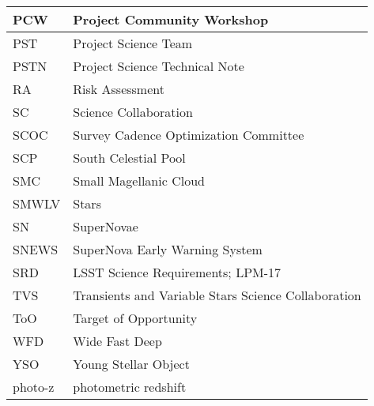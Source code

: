 \begin{longtable}{p{}p{}}
PCW & Project Community Workshop \\\hline
PST & Project Science Team \\\hline
PSTN & Project Science Technical Note \\\hline
RA & Risk Assessment \\\hline
SC & Science Collaboration \\\hline
SCOC & Survey Cadence Optimization Committee \\\hline
SCP & South Celestial Pool \\\hline
SMC & Small Magellanic Cloud \\\hline
SMWLV & Stars \\\hline
SN & SuperNovae \\\hline
SNEWS & SuperNova Early Warning System \\\hline
SRD & LSST Science Requirements; LPM-17 \\\hline
TVS & Transients and Variable Stars Science Collaboration \\\hline
ToO & Target of Opportunity \\\hline
WFD & Wide Fast Deep \\\hline
YSO & Young Stellar Object \\\hline
photo-z & photometric redshift \\\hline
\end{longtable}
